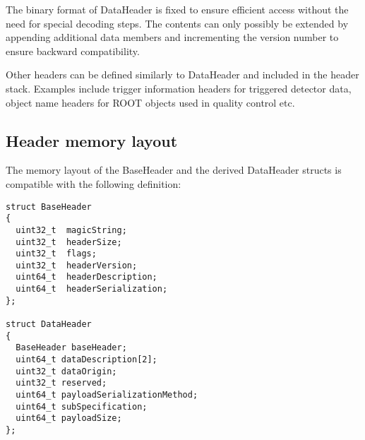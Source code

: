 \documentclass[a4paper,twoside]{article}
\begin{document}
The binary format of DataHeader is fixed to ensure efficient access without the need for special decoding steps. The contents can only possibly be extended by appending additional data members and incrementing the version number to ensure backward compatibility.

Other headers can be defined similarly to DataHeader and included in the header stack. Examples include trigger information headers for triggered detector data, object name headers for ROOT objects used in quality control etc.

\subsection{Header memory layout}
The memory layout of the BaseHeader and the derived DataHeader structs is compatible with the following definition:

\lstset{language=C++
}
\begin{lstlisting}
struct BaseHeader
{
  uint32_t  magicString;
  uint32_t  headerSize;
  uint32_t  flags;
  uint32_t  headerVersion;
  uint64_t  headerDescription;
  uint64_t  headerSerialization;
};

struct DataHeader
{
  BaseHeader baseHeader;
  uint64_t dataDescription[2];
  uint32_t dataOrigin;
  uint32_t reserved;
  uint64_t payloadSerializationMethod;
  uint64_t subSpecification;
  uint64_t payloadSize;
};

\end{lstlisting}
\end{document}
